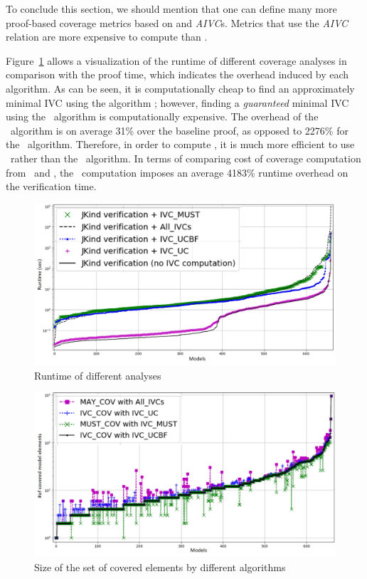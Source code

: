 To conclude this section, we should mention that one can define many more proof-based coverage metrics based on \textit{\mivcs} and \textit{AIVC}s. Metrics that use the \textit{AIVC} relation are more expensive to compute than \ivccov. 

Figure~\ref{fig:runtimeall} allows a visualization of the runtime of different coverage analyses
in comparison with the proof time, which indicates the overhead induced by each algorithm.
As can be seen, it is computationally cheap to find an
approximately minimal IVC using the algorithm \ucalg; however, finding a {\em guaranteed}
minimal IVC using the \ucbfalg\ algorithm is computationally expensive. The overhead of the \ucalg\ algorithm is on average 31\% over the baseline proof, as opposed to 2276\% for the \ucbfalg\ algorithm.
Therefore, in order to compute \ivccov, it is much more efficient to use \ucalg\ rather than the \ucbfalg\ algorithm.
In terms of comparing cost of coverage computation from \ivccov\ and \mustcov ,
the \mustcov\ computation imposes an average 4183\% runtime overhead on the verification time.


\begin{figure}
  \centering
  \includegraphics[width=\columnwidth]{figs/timing_cv.jpg}
  \caption{Runtime of different analyses}\label{fig:runtimeall}
\end{figure}


\begin{figure}
  \centering
  \includegraphics[width=\columnwidth]{figs/cv_size.jpg}
  \caption{Size of the set of covered elements by different algorithms}\label{fig:cvsize}
\end{figure}

